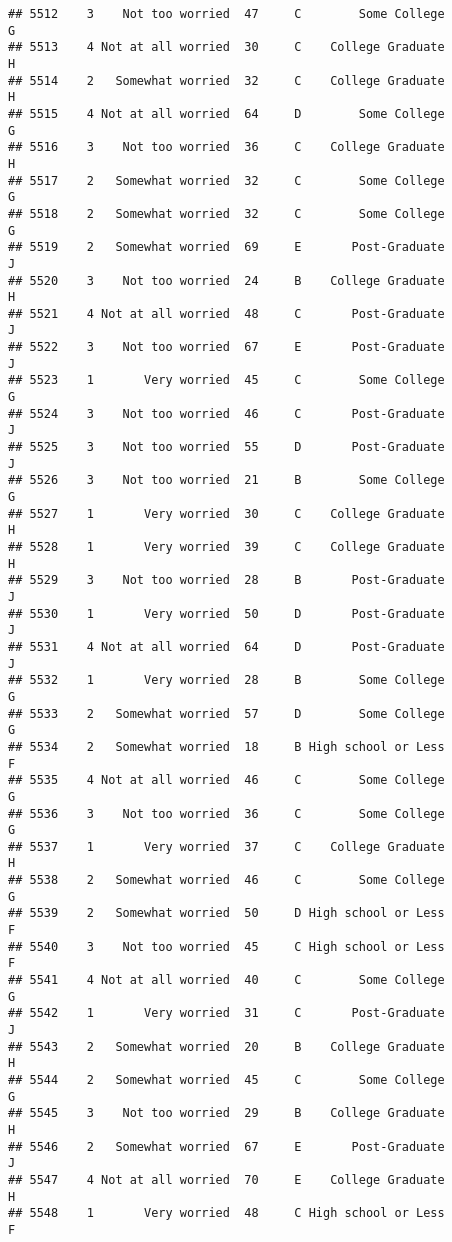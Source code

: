 \documentclass[
]{article}
\begin{document}
\begin{verbatim}
## 5512    3    Not too worried  47     C        Some College         G
## 5513    4 Not at all worried  30     C    College Graduate         H
## 5514    2   Somewhat worried  32     C    College Graduate         H
## 5515    4 Not at all worried  64     D        Some College         G
## 5516    3    Not too worried  36     C    College Graduate         H
## 5517    2   Somewhat worried  32     C        Some College         G
## 5518    2   Somewhat worried  32     C        Some College         G
## 5519    2   Somewhat worried  69     E       Post-Graduate         J
## 5520    3    Not too worried  24     B    College Graduate         H
## 5521    4 Not at all worried  48     C       Post-Graduate         J
## 5522    3    Not too worried  67     E       Post-Graduate         J
## 5523    1       Very worried  45     C        Some College         G
## 5524    3    Not too worried  46     C       Post-Graduate         J
## 5525    3    Not too worried  55     D       Post-Graduate         J
## 5526    3    Not too worried  21     B        Some College         G
## 5527    1       Very worried  30     C    College Graduate         H
## 5528    1       Very worried  39     C    College Graduate         H
## 5529    3    Not too worried  28     B       Post-Graduate         J
## 5530    1       Very worried  50     D       Post-Graduate         J
## 5531    4 Not at all worried  64     D       Post-Graduate         J
## 5532    1       Very worried  28     B        Some College         G
## 5533    2   Somewhat worried  57     D        Some College         G
## 5534    2   Somewhat worried  18     B High school or Less         F
## 5535    4 Not at all worried  46     C        Some College         G
## 5536    3    Not too worried  36     C        Some College         G
## 5537    1       Very worried  37     C    College Graduate         H
## 5538    2   Somewhat worried  46     C        Some College         G
## 5539    2   Somewhat worried  50     D High school or Less         F
## 5540    3    Not too worried  45     C High school or Less         F
## 5541    4 Not at all worried  40     C        Some College         G
## 5542    1       Very worried  31     C       Post-Graduate         J
## 5543    2   Somewhat worried  20     B    College Graduate         H
## 5544    2   Somewhat worried  45     C        Some College         G
## 5545    3    Not too worried  29     B    College Graduate         H
## 5546    2   Somewhat worried  67     E       Post-Graduate         J
## 5547    4 Not at all worried  70     E    College Graduate         H
## 5548    1       Very worried  48     C High school or Less         F

\end{verbatim}
\end{document}
